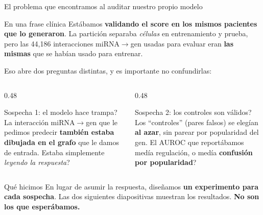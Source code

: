 \begin{frame}{El problema que encontramos al auditar nuestro propio modelo}
  \begin{block}{En una frase cl\'inica}
    \small
    Est\'abamos \textbf{validando el score en los mismos pacientes que lo generaron}. La partici\'on separaba \emph{c\'elulas} en entrenamiento y prueba, pero las 44,186 interacciones miRNA$\to$gen usadas para evaluar eran \textbf{las mismas} que se hab\'ian usado para entrenar.
  \end{block}

  \vspace{0.4em}

  \small
  Eso abre dos preguntas distintas, y es importante no confundirlas:

  \begin{columns}[T]
    \begin{column}{0.48\textwidth}
      \begin{block}{Sospecha 1: \textquestiondown{}el modelo hace trampa?}
        \scriptsize
        La interacci\'on miRNA$\to$gen que le pedimos predecir \textbf{tambi\'en estaba dibujada en el grafo} que le damos de entrada. \textquestiondown{}Estaba simplemente \emph{leyendo la respuesta}?
      \end{block}
    \end{column}
    \begin{column}{0.48\textwidth}
      \begin{block}{Sospecha 2: \textquestiondown{}los controles son v\'alidos?}
        \scriptsize
        Los ``controles'' (pares falsos) se eleg\'ian \textbf{al azar}, sin parear por popularidad del gen. \textquestiondown{}El AUROC que report\'abamos med\'ia regulaci\'on, o med\'ia \textbf{confusi\'on por popularidad}?
      \end{block}
    \end{column}
  \end{columns}

  \vspace{0.5em}
  \begin{block}{Qu\'e hicimos}
    \small
    En lugar de asumir la respuesta, dise\~namos \textbf{un experimento para cada sospecha}. Las dos siguientes diapositivas muestran los resultados. \textbf{No son los que esper\'abamos.}
  \end{block}
\end{frame}


